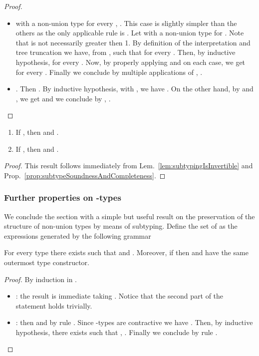 \begin{proof}
\begin{itemize}
  \item  with  a non-union type for
  every , . This case is slightly simpler than the others as
  the only applicable rule is . Let  with  a non-union type for . Note that  is
  not necessarily greater then 1. By definition of the interpretation and tree
  truncation we have, from ,  such
  that  for
  every . Then, by inductive hypothesis, 
  for every . Now, by properly applying  and
   on each case, we get  for every . Finally we conclude by multiple applications of ,
  .
  
  \item . Then . By inductive hypothesis, with
  , we have
  . On the other hand, by
   and , we get  and we conclude by ,
  .
\end{itemize}
\end{proof}



\begin{proposition}
\label{prop:subtypingIsInvertible}
\begin{enumerate}
  \item If , then  and .
  
  \item If , then  and .
\end{enumerate}
\end{proposition}

\begin{proof}
This result follows immediately from Lem.~\ref{lem:subtypingIsInvertible} and
Prop.~\ref{prop:subtypeSoundnessAndCompleteness}.
\end{proof}



\subsubsection{Further properties on \texorpdfstring{}{u}-types}


We conclude the section with a simple but useful result on the preservation of
the structure of non-union types by means of subtyping. Define the set of
 as the expressions generated by the following grammar


\begin{lemma}
\label{lem:noMuOnHeadPosition}
For every type  there exists  such that  and . Moreover, if  then
 and  have the same outermost type constructor.
\end{lemma}

\begin{proof}
By induction in .
\begin{itemize}
  \item : the result is immediate taking .
  Notice that the second part of the statement holds trivially.
  
  \item : then  and by rule
   . Since -types are
  contractive we have . Then, by inductive hypothesis, there exists  such that , . Finally we
  conclude by rule .
\end{itemize}
\end{proof}




